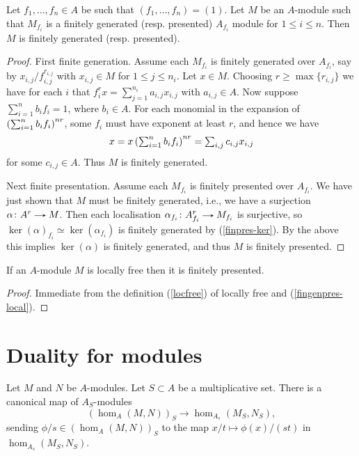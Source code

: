 \begin{proposition}
  \label{fingenpres-local}
  Let $f_1,\ldots,f_n \in A$ be such that $(f_1,\ldots,f_n) =
  (1)$. Let $M$ be an $A$-module such that $M_{f_i}$ is a finitely
  generated (resp. presented) $A_{f_i}$ module for $1 \le i \le
  n$. Then $M$ is finitely generated (resp. presented).
\end{proposition}

\begin{proof}
  First finite generation. Assume each $M_{f_i}$ is finitely generated
  over $A_{f_i}$, say by $x_{i,j}/f_{i,j}^{r_{i,j}}$ with $x_{i,j} \in
  M$ for $1 \le j \le n_i$. Let $x \in M$. Choosing $r \ge \max
  \{r_{i,j}\}$ we have for each $i$ that $f_i^rx = \sum_{j=1}^{n_i}
  a_{i,j}x_{i,j}$ with $a_{i,j} \in A$. Now suppose $\sum_{i=1}^n
  b_if_i = 1$, where $b_i \in A$. For each monomial in the expansion
  of $\left( \sum_{i=1}^n b_if_i \right)^{nr}$, some $f_i$ must have
  exponent at least $r$, and hence we have
  \[
  \textstyle{x = x\left( \sum_{i=1}^n b_if_i \right)^{nr} = \sum_{i,j}
    c_{i,j} x_{i,j}}
  \]
  for some $c_{i,j} \in A$. Thus $M$ is finitely generated.

  Next finite presentation. Assume each $M_{f_i}$ is finitely
  presented over $A_{f_i}$. We have just shown that $M$ must be
  finitely generated, i.e., we have a surjection $\alpha \c A^r \to
  M$. Then each localisation $\alpha_{f_i} \c A_{f_i}^r \to M_{f_i}$
  is surjective, so $\ker(\alpha)_{f_i} \simeq \ker(\alpha_{f_i})$ is
  finitely generated by (\ref{finpres-ker}). By the above this implies
  $\ker(\alpha)$ is finitely generated, and thus $M$ is finitely
  presented.
\end{proof}

\begin{proposition}
  If an $A$-module $M$ is locally free then it is finitely presented.
\end{proposition}

\begin{proof}
  Immediate from the definition (\ref{locfree}) of locally free and
  (\ref{fingenpres-local}).
\end{proof}


\section{Duality for modules}

\begin{nothing}
  Let $M$ and $N$ be $A$-modules. Let $S \subset A$ be a
  multiplicative set. There is a canonical map of $A_S$-modules
  \begin{equation}
    \label{hom-local-map}
    (\hom_A(M,N))_S \to \hom_{A_s}(M_S,N_S),
  \end{equation}
  sending $\phi/s \in (\hom_A(M,N))_S$ to the map $x/t \mapsto
  \phi(x)/(st)$ in $\hom_{A_s}(M_S,N_S)$.
\end{nothing}

